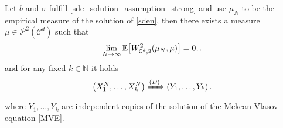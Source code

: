 \begin{theorem}
  Let $b$ and $\sigma$ fulfill \autoref{sde_solution_assumption_strong} and use 
  $\mu_N$ to be the empirical measure of the solution of \autoref{sden}, then there exists a measure $\mu \in \mathcal{P}^2(\mathcal{C}^{d} )$ such that
  \begin{align*}
    \lim_{N\to \infty}\E\big[W_{\mathcal{C}^{d},2 }^2(\mu_N,\mu )\big] = 0
, .\end{align*}
  and for any fixed $k \in  \mathbb{N}$ it holds
  \begin{align*}
    \left( X^{N}_1,\ldots ,X_k^{N}   \right)  \xRightarrow{(D)} \left( Y_{1},\ldots ,Y_{k}   \right) 
  .\end{align*}
  where $Y_1,\ldots,Y_k$ are independent copies of the solution of the Mckean-Vlasov equation \autoref{MVE}.
\end{theorem}
